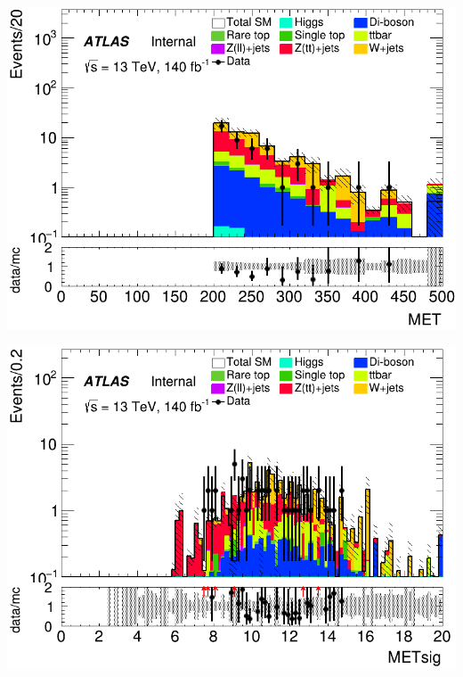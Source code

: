 \documentclass[usenames,dvipsnames]{beamer}
\begin{document}
\begin{frame}
    \vspace{0.5cm} %

    \begin{minipage}{0.32\textwidth}
        \centering
        \includegraphics[width=\textwidth]{graphics/HHH_met/HHH_met_MET.png}
    \end{minipage}
    \hfill
    \begin{minipage}{0.32\textwidth}
        \centering
        \includegraphics[width=\textwidth]{graphics/HHH_met/HHH_met_METsig.png}
    \end{minipage}
    \hfill
    

\end{frame}
\end{document}
